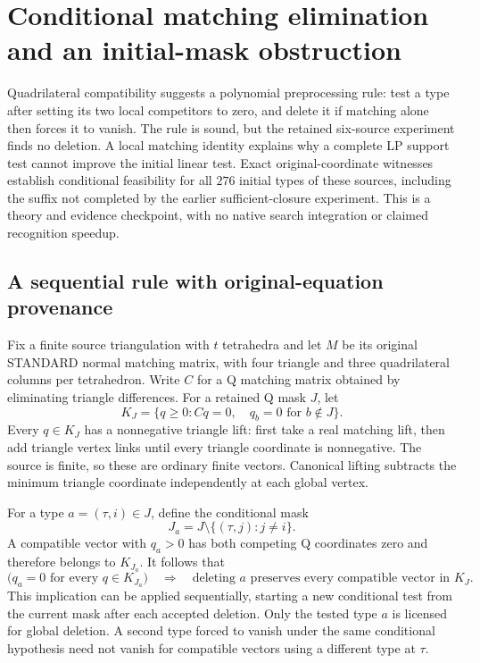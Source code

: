 \section{Conditional matching elimination and an initial-mask obstruction}
\label{sec:conditional-type-matching}

Quadrilateral compatibility suggests a polynomial preprocessing rule: test a
type after setting its two local competitors to zero, and delete it if matching
alone then forces it to vanish.  The rule is sound, but the retained six-source
experiment finds no deletion.  A local matching identity explains why a complete
LP support test cannot improve the initial linear test.  Exact original-coordinate
witnesses establish conditional feasibility for all $276$ initial types of these
sources, including the suffix not completed by the earlier sufficient-closure
experiment.  This is a theory and evidence checkpoint, with no native search
integration or claimed recognition speedup.

\subsection{A sequential rule with original-equation provenance}

Fix a finite source triangulation with $t$ tetrahedra and let $M$ be its
original STANDARD normal matching matrix, with four triangle and three
quadrilateral columns per tetrahedron.  Write $C$ for a Q matching matrix
obtained by eliminating triangle differences.  For a retained Q mask $J$, let
\[
 K_J=\{q\ge0:Cq=0,\quad q_b=0\text{ for }b\notin J\}.
\]
Every $q\in K_J$ has a nonnegative triangle lift: first take a real matching
lift, then add triangle vertex links until every triangle coordinate is
nonnegative.  The source is finite, so these are ordinary finite vectors.
Canonical lifting subtracts the minimum triangle coordinate independently
at each global vertex.

For a type $a=(\tau,i)\in J$, define the conditional mask
\[
 J_a=J\setminus\{(\tau,j):j\ne i\}.
\]
A compatible vector with $q_a>0$ has both competing Q coordinates zero and
therefore belongs to $K_{J_a}$.  It follows that
\[
 \bigl(q_a=0\text{ for every }q\in K_{J_a}\bigr)
 \quad\Longrightarrow\quad
 \text{deleting $a$ preserves every compatible vector in }K_J.
\]
This implication can be applied sequentially, starting a new conditional
test from the current mask after each accepted deletion.  Only the tested
type $a$ is licensed for global deletion.  A second type forced to vanish
under the same conditional hypothesis need not vanish for compatible
vectors using a different type at $\tau$.

